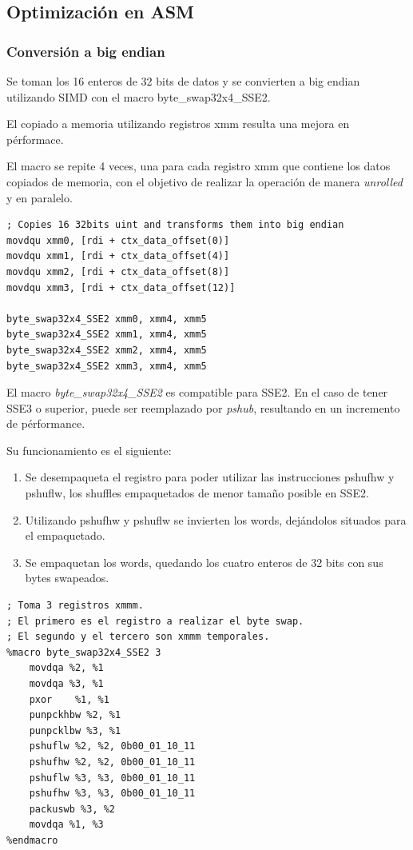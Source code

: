\documentclass[a4paper, 10pt, twoside]{article}
\begin{document}
\subsection{Optimización en ASM}

\subsubsection{Conversión a big endian}

Se toman los 16 enteros de 32 bits de datos y se convierten a big endian utilizando SIMD con 
el macro byte\_swap32x4\_SSE2. 

El copiado a memoria utilizando registros xmm resulta una mejora en pérformace. 

El macro se repite 4 veces, una para cada registro xmm que contiene 
los datos copiados de memoria, con el objetivo de realizar la operación de manera \textit{unrolled} y 
en paralelo.

\begin{verbatim}
; Copies 16 32bits uint and transforms them into big endian
movdqu xmm0, [rdi + ctx_data_offset(0)]
movdqu xmm1, [rdi + ctx_data_offset(4)]
movdqu xmm2, [rdi + ctx_data_offset(8)]
movdqu xmm3, [rdi + ctx_data_offset(12)]

byte_swap32x4_SSE2 xmm0, xmm4, xmm5 
byte_swap32x4_SSE2 xmm1, xmm4, xmm5
byte_swap32x4_SSE2 xmm2, xmm4, xmm5
byte_swap32x4_SSE2 xmm3, xmm4, xmm5

\end{verbatim}

El macro \textit{byte\_swap32x4\_SSE2} es compatible para SSE2. En el caso de tener SSE3 o superior, puede ser reemplazado por 
\textit{pshub}, resultando en un incremento de pérformance.

Su funcionamiento es el siguiente:
\begin{enumerate}
	\item Se desempaqueta el registro para poder utilizar las instrucciones pshufhw y pshuflw, los shuffles empaquetados de menor 
	tamaño posible en SSE2.
	\item Utilizando pshufhw y pshuflw se invierten los words, dejándolos situados para el empaquetado.
	\item Se empaquetan los words, quedando los cuatro enteros de 32 bits con sus bytes swapeados.
\end{enumerate}

\begin{verbatim}
; Toma 3 registros xmmm.
; El primero es el registro a realizar el byte swap.
; El segundo y el tercero son xmmm temporales.
%macro byte_swap32x4_SSE2 3
    movdqa %2, %1
    movdqa %3, %1
    pxor    %1, %1
    punpckhbw %2, %1
    punpcklbw %3, %1
    pshuflw %2, %2, 0b00_01_10_11
    pshufhw %2, %2, 0b00_01_10_11 
    pshuflw %3, %3, 0b00_01_10_11
    pshufhw %3, %3, 0b00_01_10_11
    packuswb %3, %2
    movdqa %1, %3
%endmacro
\end{verbatim}
\end{document}
